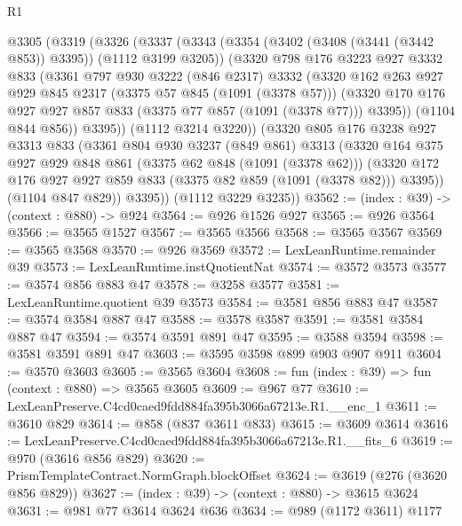 \begin{lexlean}{R1}
\begin{coremodule}
  @3305
    (@3319
      (@3326
        (@3337
          (@3343
            (@3354 (@3402 (@3408 (@3441 (@3442 @853)) @3395)) (@1112 @3199 @3205))
            (@3320
              @798
              @176
              @3223
              @927
              @3332
              @833
              (@3361
                @797
                @930
                @3222
                (@846 @2317)
                @3332
                (@3320
                  @162
                  @263
                  @927
                  @929
                  @845
                  @2317
                  (@3375 @57 @845 (@1091 (@3378 @57)))
                  (@3320 @170 @176 @927 @927 @857 @833 (@3375 @77 @857 (@1091 (@3378 @77))) @3395))
                (@1104 @844 @856))
              @3395))
          (@1112 @3214 @3220))
        (@3320
          @805
          @176
          @3238
          @927
          @3313
          @833
          (@3361
            @804
            @930
            @3237
            (@849 @861)
            @3313
            (@3320
              @164
              @375
              @927
              @929
              @848
              @861
              (@3375 @62 @848 (@1091 (@3378 @62)))
              (@3320 @172 @176 @927 @927 @859 @833 (@3375 @82 @859 (@1091 (@3378 @82))) @3395))
            (@1104 @847 @829))
          @3395))
      (@1112 @3229 @3235))
@3562 := (index : @39) -> (context : @880) -> @924
@3564 := @926 @1526 @927
@3565 := @926 @3564
@3566 := @3565 @1527
@3567 := @3565 @3566
@3568 := @3565 @3567
@3569 := @3565 @3568
@3570 := @926 @3569
@3572 := LexLeanRuntime.remainder @39
@3573 := LexLeanRuntime.instQuotientNat
@3574 := @3572 @3573
@3577 := @3574 @856 @883 @47
@3578 := @3258 @3577
@3581 := LexLeanRuntime.quotient @39 @3573
@3584 := @3581 @856 @883 @47
@3587 := @3574 @3584 @887 @47
@3588 := @3578 @3587
@3591 := @3581 @3584 @887 @47
@3594 := @3574 @3591 @891 @47
@3595 := @3588 @3594
@3598 := @3581 @3591 @891 @47
@3603 := @3595 @3598 @899 @903 @907 @911
@3604 := @3570 @3603
@3605 := @3565 @3604
@3608 := fun (index : @39) => fun (context : @880) => @3565 @3605
@3609 := @967 @77
@3610 := LexLeanPreserve.C4cd0caed9fdd884fa395b3066a67213e.R1.__enc_1
@3611 := @3610 @829
@3614 := @858 (@837 @3611 @833)
@3615 := @3609 @3614
@3616 := LexLeanPreserve.C4cd0caed9fdd884fa395b3066a67213e.R1.__fits_6
@3619 := @970 (@3616 @856 @829)
@3620 := PrismTemplateContract.NormGraph.blockOffset
@3624 := @3619 (@276 (@3620 @856 @829))
@3627 := (index : @39) -> (context : @880) -> @3615 @3624
@3631 := @981 @77 @3614 @3624 @636
@3634 := @989 (@1172 @3611) @1177

\end{coremodule}
\end{lexlean}
